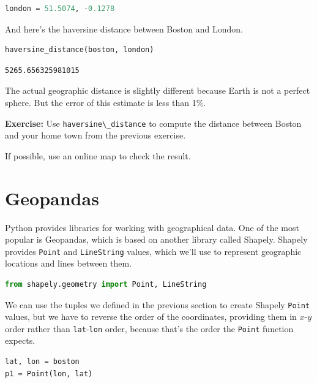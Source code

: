 \begin{lstlisting}[language=Python,style=source]
london = 51.5074, -0.1278
\end{lstlisting}

And here's the haversine distance between Boston and London.

\begin{lstlisting}[language=Python,style=source]
haversine_distance(boston, london)
\end{lstlisting}

\begin{lstlisting}[style=output]
5265.656325981015
\end{lstlisting}

The actual geographic distance is slightly different because Earth is
not a perfect sphere. But the error of this estimate is less than 1\%.

\textbf{Exercise:} Use \passthrough{\lstinline!haversine\_distance!} to
compute the distance between Boston and your home town from the previous
exercise.

If possible, use an online map to check the result.

\hypertarget{geopandas}{%
\section{Geopandas}\label{geopandas}}

Python provides libraries for working with geographical data. One of the
most popular is Geopandas, which is based on another library called
Shapely. Shapely provides \passthrough{\lstinline!Point!} and
\passthrough{\lstinline!LineString!} values, which we'll use to
represent geographic locations and lines between them.

\begin{lstlisting}[language=Python,style=source]
from shapely.geometry import Point, LineString
\end{lstlisting}

We can use the tuples we defined in the previous section to create
Shapely \passthrough{\lstinline!Point!} values, but we have to reverse
the order of the coordinates, providing them in \(x\)-\(y\) order rather
than \passthrough{\lstinline!lat!}-\passthrough{\lstinline!lon!} order,
because that's the order the \passthrough{\lstinline!Point!} function
expects.

\begin{lstlisting}[language=Python,style=source]
lat, lon = boston
p1 = Point(lon, lat)
\end{lstlisting}

